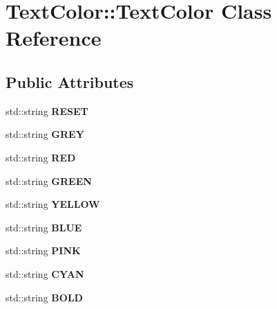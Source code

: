 \hypertarget{classTextColor_1_1TextColor}{}\section{Text\+Color\+:\+:Text\+Color Class Reference}
\label{classTextColor_1_1TextColor}
\subsection*{Public Attributes}
\begin{DoxyCompactItemize}
\item 
std\+::string {\bfseries R\+E\+S\+ET}\hypertarget{classTextColor_1_1TextColor_a4ce7816fe51451e155285e2383cf3a87}{}\label{classTextColor_1_1TextColor_a4ce7816fe51451e155285e2383cf3a87}

\item 
std\+::string {\bfseries G\+R\+EY}\hypertarget{classTextColor_1_1TextColor_abd3ac2b4eaacc00fdd09bba6b1e2c58a}{}\label{classTextColor_1_1TextColor_abd3ac2b4eaacc00fdd09bba6b1e2c58a}

\item 
std\+::string {\bfseries R\+ED}\hypertarget{classTextColor_1_1TextColor_a353bec5c7eab3a033fc7024ff277a0b7}{}\label{classTextColor_1_1TextColor_a353bec5c7eab3a033fc7024ff277a0b7}

\item 
std\+::string {\bfseries G\+R\+E\+EN}\hypertarget{classTextColor_1_1TextColor_af991e1c2a6c7dc86c8e4d9f3e70b30d3}{}\label{classTextColor_1_1TextColor_af991e1c2a6c7dc86c8e4d9f3e70b30d3}

\item 
std\+::string {\bfseries Y\+E\+L\+L\+OW}\hypertarget{classTextColor_1_1TextColor_adda293dd0eaed6d4bae8ec88f238f25e}{}\label{classTextColor_1_1TextColor_adda293dd0eaed6d4bae8ec88f238f25e}

\item 
std\+::string {\bfseries B\+L\+UE}\hypertarget{classTextColor_1_1TextColor_a6cb7f203b472d94da64aaf2e45d71ed8}{}\label{classTextColor_1_1TextColor_a6cb7f203b472d94da64aaf2e45d71ed8}

\item 
std\+::string {\bfseries P\+I\+NK}\hypertarget{classTextColor_1_1TextColor_abdb8e9a12d6bf0020fb6376a9316a0fa}{}\label{classTextColor_1_1TextColor_abdb8e9a12d6bf0020fb6376a9316a0fa}

\item 
std\+::string {\bfseries C\+Y\+AN}\hypertarget{classTextColor_1_1TextColor_a64127e3bcdc07ded19ed1d3e5d768043}{}\label{classTextColor_1_1TextColor_a64127e3bcdc07ded19ed1d3e5d768043}

\item 
std\+::string {\bfseries B\+O\+LD}\hypertarget{classTextColor_1_1TextColor_a79e2c0706bf90bb33c62e4b2081994cf}{}\label{classTextColor_1_1TextColor_a79e2c0706bf90bb33c62e4b2081994cf}

\end{DoxyCompactItemize}
